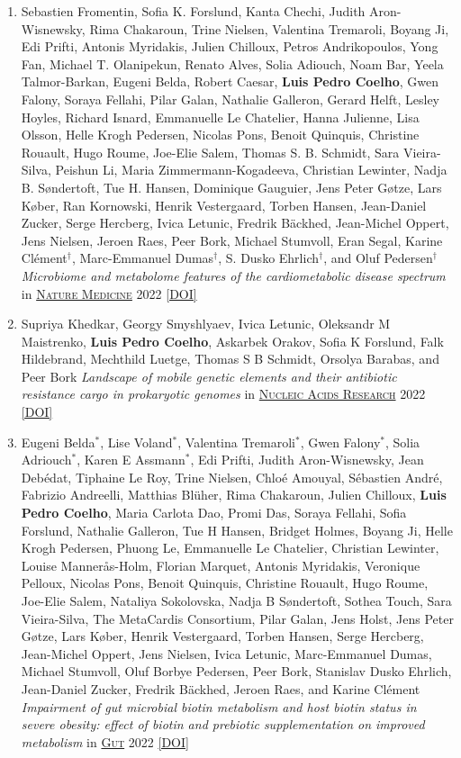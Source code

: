 \documentclass{article}
\newcommand\showdoi[1]{%
    \href{https://doi.org/#1}{[DOI]}%
}
\newcommand\pubname[1]{\textsc{\uline{#1}}}
\newcommand\costar{${}^{*}$}
\newcommand\cosenior{${}^{\dagger}$}
\begin{document}
\begin{enumerate}[resume]
\item Sebastien Fromentin, Sofia K. Forslund, Kanta Chechi, Judith Aron-Wisnewsky, Rima Chakaroun, Trine Nielsen, Valentina Tremaroli, Boyang Ji, Edi Prifti, Antonis Myridakis, Julien Chilloux, Petros Andrikopoulos, Yong Fan, Michael T. Olanipekun, Renato Alves, Solia Adiouch, Noam Bar, Yeela Talmor-Barkan, Eugeni Belda, Robert Caesar, \textbf{Luis Pedro Coelho}, Gwen Falony, Soraya Fellahi, Pilar Galan, Nathalie Galleron, Gerard Helft, Lesley Hoyles, Richard Isnard, Emmanuelle Le Chatelier, Hanna Julienne, Lisa Olsson, Helle Krogh Pedersen, Nicolas Pons, Benoit Quinquis, Christine Rouault, Hugo Roume, Joe-Elie Salem, Thomas S. B. Schmidt, Sara Vieira-Silva, Peishun Li, Maria Zimmermann-Kogadeeva, Christian Lewinter, Nadja B. Søndertoft, Tue H. Hansen, Dominique Gauguier, Jens Peter Gøtze, Lars Køber, Ran Kornowski, Henrik Vestergaard, Torben Hansen, Jean-Daniel Zucker, Serge Hercberg, Ivica Letunic, Fredrik Bäckhed, Jean-Michel Oppert, Jens Nielsen, Jeroen Raes, Peer Bork, Michael Stumvoll, Eran Segal, Karine Clément\cosenior, Marc-Emmanuel Dumas\cosenior, S. Dusko Ehrlich\cosenior, and Oluf Pedersen\cosenior \emph{Microbiome and metabolome features of the cardiometabolic disease spectrum} in \pubname{Nature Medicine} 2022 \showdoi{10.1038/s41591-022-01688-4}

\item Supriya Khedkar, Georgy Smyshlyaev, Ivica Letunic, Oleksandr M Maistrenko, \textbf{Luis Pedro Coelho}, Askarbek Orakov, Sofia K Forslund, Falk Hildebrand, Mechthild Luetge, Thomas S B Schmidt, Orsolya Barabas, and Peer Bork \emph{Landscape of mobile genetic elements and their antibiotic resistance cargo in prokaryotic genomes} in \pubname{Nucleic Acids Research} 2022 \showdoi{10.1093/nar/gkac163}

\item Eugeni Belda\costar, Lise Voland\costar, Valentina Tremaroli\costar, Gwen Falony\costar, Solia Adriouch\costar, Karen E Assmann\costar, Edi Prifti, Judith Aron-Wisnewsky, Jean Debédat, Tiphaine Le Roy, Trine Nielsen, Chloé Amouyal, Sébastien André, Fabrizio Andreelli, Matthias Blüher, Rima Chakaroun, Julien Chilloux, \textbf{Luis Pedro Coelho}, Maria Carlota Dao, Promi Das, Soraya Fellahi, Sofia Forslund, Nathalie Galleron, Tue H Hansen, Bridget Holmes, Boyang Ji, Helle Krogh Pedersen, Phuong Le, Emmanuelle Le Chatelier, Christian Lewinter, Louise Mannerås-Holm, Florian Marquet, Antonis Myridakis, Veronique Pelloux, Nicolas Pons, Benoit Quinquis, Christine Rouault, Hugo Roume, Joe-Elie Salem, Nataliya Sokolovska, Nadja B Søndertoft, Sothea Touch, Sara Vieira-Silva, The MetaCardis Consortium, Pilar Galan, Jens Holst, Jens Peter Gøtze, Lars Køber, Henrik Vestergaard, Torben Hansen, Serge Hercberg, Jean-Michel Oppert, Jens Nielsen, Ivica Letunic, Marc-Emmanuel Dumas, Michael Stumvoll, Oluf Borbye Pedersen, Peer Bork, Stanislav Dusko Ehrlich, Jean-Daniel Zucker, Fredrik Bäckhed, Jeroen Raes, and Karine Clément \emph{Impairment of gut microbial biotin metabolism and host biotin status in severe obesity: effect of biotin and prebiotic supplementation on improved metabolism} in \pubname{Gut} 2022 \showdoi{10.1136/gutjnl-2021-325753}


\end{enumerate}
\end{document}
